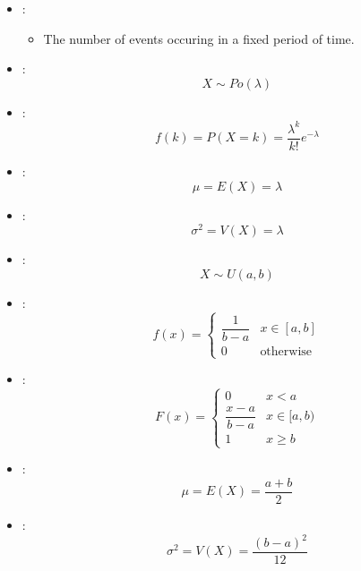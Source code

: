 \begin{multicols*}{3}
    \begin{itemize}
      \item {}:
        \begin{itemize}
          \item The number of events occuring in a fixed period of time.
        \end{itemize}
      \item {}:
        \[
          X \sim Po(\lambda)
        \]
      \item {}:
        \[
          f(k) = P(X = k) = \frac{\lambda^k}{k!} e^{-\lambda}
        \]
      \item {}:
        \[
          \mu = E(X) = \lambda
        \]
      \item {}:
        \[
          \sigma^2 = V(X) = \lambda
        \]
    \end{itemize}


    \begin{itemize}
      \item {}:
        \[
          X \sim U(a, b)
        \]
      \item {}:
        \[
          f(x) =
            \begin{cases}
              \dfrac{1}{b - a} & x \in [a, b]\\
              0 & \text{otherwise}
            \end{cases}
        \]
      \item {}:
        \[
          F(x) =
            \begin{cases}
              0 & x < a \\
              \dfrac{x - a}{b - a} & x \in [a, b)\\
              1 & x \geq b
            \end{cases}
        \]
      \item {}:
        \[
          \mu = E(X) = \frac{a + b}{2}
        \]
      \item {}:
        \[
          \sigma^2 = V(X) = \frac{(b - a)^2}{12}
        \]
    \end{itemize}


\end{multicols*}
